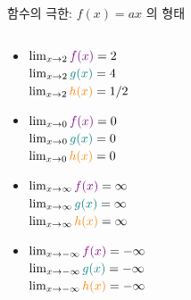 \documentclass[aspectratio=169]{beamer}
\begin{document}
\begin{frame}{함수의 극한: $f(x) = ax$ 의 형태}
\begin{columns}
    \begin{column}{0.45\textwidth}
      \begin{itemize}
        \item $\lim_{x \to 2} \textcolor{violet}{f(x)} = 2$ \\
          $\lim_{x \to 2} \textcolor{teal}{g(x)} = 4$ \\
          $\lim_{x \to 2} \textcolor{orange}{h(x)} = 1/2$
        \item $\lim_{x \to 0} \textcolor{violet}{f(x)} = 0 $ \\
          $\lim_{x \to 0} \textcolor{teal}{g(x)} = 0 $ \\
          $\lim_{x \to 0} \textcolor{orange}{h(x)} = 0 $
        \item $\lim_{x \to \infty} \textcolor{violet}{f(x)} = \infty $ \\
          $\lim_{x \to \infty} \textcolor{teal}{g(x)} = \infty $ \\
          $\lim_{x \to \infty} \textcolor{orange}{h(x)} = \infty $
        \item $\lim_{x \to -\infty} \textcolor{violet}{f(x)} = -\infty $ \\
          $\lim_{x \to -\infty} \textcolor{teal}{g(x)} = -\infty $ \\
          $\lim_{x \to -\infty} \textcolor{orange}{h(x)} = -\infty $
      \end{itemize}
    \end{column}
  \end{columns}
\end{frame}
\end{document}

